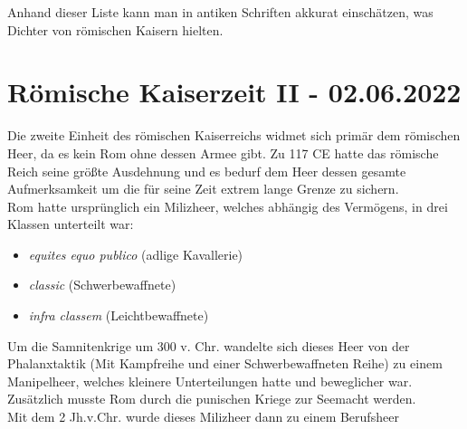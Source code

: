 \documentclass{article}
\begin{document}
	Anhand dieser Liste kann man in antiken Schriften akkurat einschätzen, was Dichter von römischen Kaisern hielten. \\

	\section{Römische Kaiserzeit II - 02.06.2022}

	Die zweite Einheit des römischen Kaiserreichs widmet sich primär dem römischen Heer, da es kein Rom ohne dessen Armee gibt. Zu 117 CE hatte das römische Reich seine größte Ausdehnung und es bedurf dem Heer dessen gesamte Aufmerksamkeit um die für seine Zeit extrem lange Grenze zu sichern. \\
	Rom hatte ursprünglich ein Milizheer, welches abhängig des Vermögens, in drei Klassen unterteilt war:
	\begin{itemize}
		\item{\textit{equites equo publico} (adlige Kavallerie)}
		\item{\textit{classic} (Schwerbewaffnete)}
		\item{\textit{infra classem} (Leichtbewaffnete)}
	\end{itemize}

	Um die Samnitenkrige um 300 v. Chr. wandelte sich dieses Heer von der Phalanxtaktik (Mit Kampfreihe und einer Schwerbewaffneten Reihe) zu einem Manipelheer, welches kleinere Unterteilungen hatte und beweglicher war. Zusätzlich musste Rom durch die punischen Kriege zur Seemacht werden. \\
	Mit dem 2 Jh.v.Chr. wurde dieses Milizheer dann zu einem Berufsheer
\end{document}
